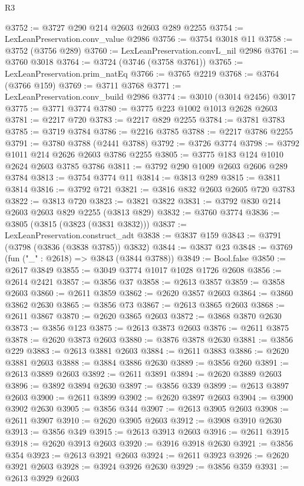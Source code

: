 \begin{lexlean}{R3}
\begin{coremodule}
@3752 := @3727 @290 @214 @2603 @2603 @289 @2255
@3754 := LexLeanPreservation.conv_value @2986
@3756 := @3754 @3018 @11
@3758 := @3752 (@3756 @289)
@3760 := LexLeanPreservation.convL_nil @2986
@3761 := @3760 @3018
@3764 := @3724 (@3746 (@3758 @3761))
@3765 := LexLeanPreservation.prim_natEq
@3766 := @3765 @2219
@3768 := @3764 (@3766 @159)
@3769 := @3711 @3768
@3771 := LexLeanPreservation.conv_build @2986
@3774 := @3010 (@3014 @2456) @3017
@3775 := @3771 @3774
@3780 := @3775 @223 @1002 @1013 @2628 @2603
@3781 := @2217 @720
@3783 := @2217 @829 @2255
@3784 := @3781 @3783
@3785 := @3719 @3784
@3786 := @2216 @3785
@3788 := @2217 @3786 @2255
@3791 := @3780 @3788 (@2441 @3788)
@3792 := @3726 @3774
@3798 := @3792 @1011 @214 @2626 @2603 @3786 @2255
@3805 := @3775 @183 @124 @1010 @2624 @2603 @3785 @3786
@3811 := @3792 @290 @1009 @2603 @2606 @289 @3784
@3813 := @3754 @3774 @11
@3814 := @3813 @289
@3815 := @3811 @3814
@3816 := @3792 @721
@3821 := @3816 @832 @2603 @2605 @720 @3783
@3822 := @3813 @720
@3823 := @3821 @3822
@3831 := @3792 @830 @214 @2603 @2603 @829 @2255 (@3813 @829)
@3832 := @3760 @3774
@3836 := @3805 (@3815 (@3823 (@3831 @3832)))
@3837 := LexLeanPreservation.construct_adt
@3838 := @3837 @159
@3843 := @3791 (@3798 (@3836 (@3838 @3785)) @3832)
@3844 := @3837 @23
@3848 := @3769 (fun ("_" : @2618) => @3843 (@3844 @3788))
@3849 := Bool.false
@3850 := @2617 @3849
@3855 := @3049 @3774 @1017 @1028 @1726 @2608
@3856 := @2614 @2421
@3857 := @3856 @37
@3858 := @2613 @3857
@3859 := @3858 @2603
@3860 := @2611 @3859
@3862 := @2620 @3857 @2603
@3864 := @3860 @3862 @2630
@3865 := @3856 @73
@3867 := @2613 @3865 @2603
@3868 := @2611 @3867
@3870 := @2620 @3865 @2603
@3872 := @3868 @3870 @2630
@3873 := @3856 @123
@3875 := @2613 @3873 @2603
@3876 := @2611 @3875
@3878 := @2620 @3873 @2603
@3880 := @3876 @3878 @2630
@3881 := @3856 @229
@3883 := @2613 @3881 @2603
@3884 := @2611 @3883
@3886 := @2620 @3881 @2603
@3888 := @3884 @3886 @2630
@3889 := @3856 @260
@3891 := @2613 @3889 @2603
@3892 := @2611 @3891
@3894 := @2620 @3889 @2603
@3896 := @3892 @3894 @2630
@3897 := @3856 @339
@3899 := @2613 @3897 @2603
@3900 := @2611 @3899
@3902 := @2620 @3897 @2603
@3904 := @3900 @3902 @2630
@3905 := @3856 @344
@3907 := @2613 @3905 @2603
@3908 := @2611 @3907
@3910 := @2620 @3905 @2603
@3912 := @3908 @3910 @2630
@3913 := @3856 @349
@3915 := @2613 @3913 @2603
@3916 := @2611 @3915
@3918 := @2620 @3913 @2603
@3920 := @3916 @3918 @2630
@3921 := @3856 @354
@3923 := @2613 @3921 @2603
@3924 := @2611 @3923
@3926 := @2620 @3921 @2603
@3928 := @3924 @3926 @2630
@3929 := @3856 @359
@3931 := @2613 @3929 @2603

\end{coremodule}
\end{lexlean}
